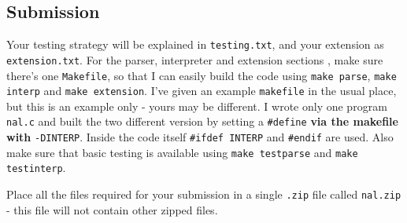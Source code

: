 \begin{exercise}
\subsection*{Submission}

Your testing strategy will be explained in \verb^testing.txt^, and
your extension as \verb^extension.txt^. For the parser, interpreter
and extension sections , make sure there's one \verb^Makefile^, so that I
can easily build the code using \verb^make parse^, \verb^make interp^
and \verb^make extension^. I've given an example \verb^makefile^ in the
usual place, but this is an example only - yours may be different.
I wrote only one program \verb^nal.c^ and built the two
different version by setting a \verb^#define^ {\bf via the makefile with}
\verb^-DINTERP^. Inside the code itself \verb^#ifdef INTERP^ and \verb^#endif^ are used.
Also make sure that basic testing is available using \verb^make testparse^ and \verb^make testinterp^.

\noindent Place all the files required for your submission in a single \verb^.zip^ file called \verb^nal.zip^ - this file will not contain other zipped files.

\end{exercise}


